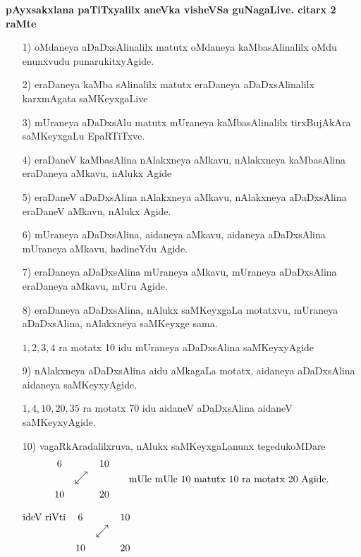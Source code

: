 \smallskip
\noindent
\textbf{pAyxsakxlana paTiTxyalilx aneVka visheVSa guNagaLive. citarx {\rm 2} raMte}
\begin{enumerate}
\item[{\rm 1)}] oMdaneya aDaDxsAlinalilx matutx oMdaneya kaMbasAlinalilx oMdu enunxvudu punarukitxyAgide.

\item[{\rm 2)}] eraDaneya kaMba sAlinalilx matutx eraDaneya aDaDxsAlinalilx karxmAgata saMKeyxgaLive

\item[{\rm 3)}] mUraneya aDaDxsAlu matutx mUraneya kaMbasAlinalilx tirxBujAkAra saMKeyxgaLu EpaRTiTxve.

\item[{\rm 4)}]eraDaneV kaMbasAlina nAlakxneya aMkavu, nAlakxneya kaMbasAlina eraDaneya aMkavu, nAlukx Agide

\item[{\rm 5)}] eraDaneV aDaDxsAlina nAlakxneya aMkavu, nAlakxneya aDaDxsAlina eraDaneV aMkavu, nAlukx Agide.

\item[{\rm 6)}] mUraneya aDaDxsAlina, aidaneya aMkavu, aidaneya aDaDxsAlina mUraneya aMkavu, hadineYdu Agide.

\item[{\rm 7)}] eraDaneya aDaDxsAlina mUraneya aMkavu, mUraneya aDaDxsAlina eraDaneya aMkavu, mUru Agide.

\item[{\rm 8)}] eraDaneya aDaDxsAlina, nAlukx saMKeyxgaLa motatxvu, mUraneya aDaDxsAlina, nAlakxneya saMKeyxge sama.

$1, 2, 3, 4$ ra motatx {\rm 10} idu mUraneya aDaDxsAlina saMKeyxyAgide

\item[{\rm 9)}] nAlakxneya aDaDxsAlina aidu aMkagaLa motatx, aidaneya aDaDxsAlina aidaneya saMKeyxyAgide.

$1, 4, 10, 20, 35$ ra motatx {\rm 70} idu aidaneV aDaDxsAlina aidaneV saMKeyxyAgide.

\item[{\rm 10)}]  vagaRkAradalilxruva, nAlukx saMKeyxgaLanunx tegedukoMDare 
$$
\begin{matrix}
6 && 10\\
& \rotatebox{45}{$\longleftrightarrow$} & \\
10 && 20
\end{matrix}
\qquad \text{mUle mUle {\rm 10} matutx {\rm 10} ra motatx {\rm 20} Agide.}
$$
\begin{center}
$\begin{matrix}
\text{ideV riVti} & 6 && 10\\
&& \rotatebox{45}{$\longleftrightarrow$} & \\
& 10 && 20
\end{matrix}$
\quad {}\\[-0.55cm]
\end{center}


\end{enumerate}
